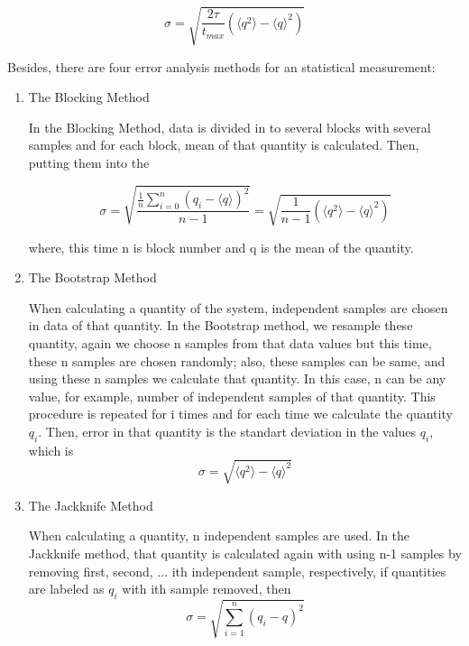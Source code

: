 \documentclass[12pt,fleqn]{report}
\begin{document}
\begin{equation}
\sigma = \sqrt{\frac{2\tau}{t_{max}} (\langle q^2\rangle - \langle 
q\rangle^2)}
\end{equation}

Besides, there are four error analysis methods for an statistical 
measurement: 

\begin{enumerate}

\item The Blocking Method

In the Blocking Method, data is  divided in to several blocks with several 
samples and for each block, mean of that quantity is calculated. Then, 
putting them into the 

\begin{equation}
\sigma = \sqrt{\frac{\frac{1}{n} \sum\limits_{i=0}^n (q_i - \langle q 
\rangle )^2}{n-1}} = \sqrt{\frac{1}{n-1} (\langle q^2 \rangle - \langle 
q\rangle^2)}
\end{equation}

where, this time n is block number and q is the mean of the quantity.  

\item The Bootstrap Method

When calculating a quantity of the system, independent samples are chosen 
in data of that quantity. In the Bootstrap method, we resample these 
quantity, again we choose n samples from that data values but this time, 
these n samples are chosen randomly; also, these samples can be same, 
and using these n samples we calculate that quantity. In this case, n can be 
any value, for example, number of independent samples of that quantity. 
This procedure is repeated for i times and for each time we calculate the 
quantity $q_i$. Then, error in that quantity is the standart deviation in the 
values $q_i$, which is 
\begin{equation}
\sigma= \sqrt{\langle q^2 \rangle - \langle q \rangle^2}
\end{equation}

\item The Jackknife Method

When calculating a quantity, n independent samples are used. In the 
Jackknife method, that quantity is calculated again with using n-1 samples 
by removing first, second, ... ith independent sample, respectively, if 
quantities are labeled as $q_i$ with ith sample removed, then 
\begin{equation}
\sigma = \sqrt{\sum\limits_{i=1}^n (q_i - q )^2}
\end{equation}


\end{enumerate}
\end{document}
